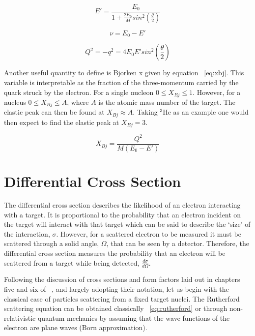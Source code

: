 \begin{equation} \label{eq:E'}
	E' = \frac{E_0}{1+\frac{2E_0}{M}sin^2\left(\frac{\theta}{2}\right)}
\end{equation}

\begin{equation} \label{eq:nu}
	\nu = E_0-E'
\end{equation}

\begin{equation} \label{eq:Q^2}
	Q^2 = -q^2 = 4E_0E'sin^2\left(\frac{\theta}{2}\right)
\end{equation}

Another useful quantity to define is Bjorken x given by equation ~\ref{eq:xbj}. This variable is interpretable as the fraction of the three-momentum carried by the quark struck by the electron. For a single nucleon $0 \leq X_{Bj} \leq 1$. However, for a nucleus $0 \leq X_{Bj} \leq A$, where $A$ is the atomic mass number of the target. The elastic peak can then be found at $X_{Bj} \approx A$. Taking $^3$He as an example one would then expect to find the elastic peak at $X_{Bj} = 3$.

\begin{equation} \label{eq:xbj}
	X_{Bj} = \frac{Q^2}{M(E_0-E')} 
\end{equation}

\section{Differential Cross Section}
\label{sec:xs}

The differential cross section describes the likelihood of an electron interacting with a target. It is proportional to the probability that an electron incident on the target will interact with that target which can be said to describe the `size' of the interaction, $\sigma$. However, for a scattered electron to be measured it must be scattered through a solid angle, $\Omega$, that can be seen by a detector. Therefore, the differential cross section measures the probability that an electron will be scattered from a target while being detected, $\frac{d\sigma}{d\Omega}$.

Following the discussion of cross sections and form factors laid out in chapters five and six of ~\cite{Book:Povh}, and largely adopting their notation, let us begin with the classical case of particles scattering from a fixed target nuclei. The Rutherford scattering equation can be obtained classically ~\ref{eq:rutherford} or through non-relativistic quantum mechanics by assuming that the wave functions of the electron are plane waves (Born approximation).   


